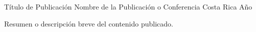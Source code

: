 
\begin{cventries}

  \cventry
    {Título de Publicación}
    {Nombre de la Publicación o Conferencia}
    {Costa Rica}
    {Año}
    {
      \begin{cvitems}
        \item {Resumen o descripción breve del contenido publicado.}
      \end{cvitems}
    }

\end{cventries}
